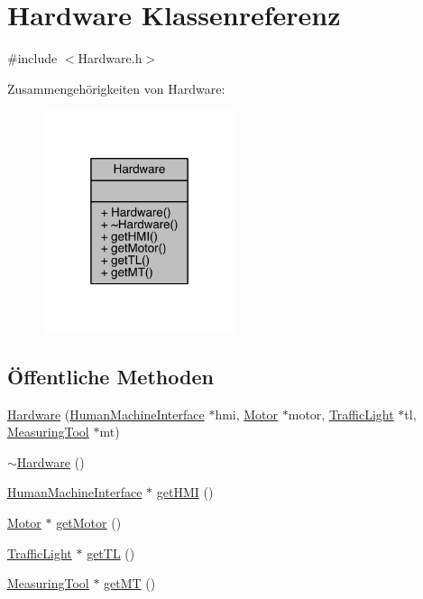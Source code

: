 \hypertarget{class_hardware}{}\section{Hardware Klassenreferenz}
\label{class_hardware}


{\ttfamily \#include $<$Hardware.\+h$>$}



Zusammengehörigkeiten von Hardware\+:\nopagebreak
\begin{figure}[H]
\begin{center}
\leavevmode
\includegraphics[width=160pt]{class_hardware__coll__graph}
\end{center}
\end{figure}
\subsection*{Öffentliche Methoden}
\begin{DoxyCompactItemize}
\item 
\hyperlink{class_hardware_a554fd479b788d6d73473aceb117f17d8}{Hardware} (\hyperlink{class_human_machine_interface}{Human\+Machine\+Interface} $\ast$hmi, \hyperlink{class_motor}{Motor} $\ast$motor, \hyperlink{class_traffic_light}{Traffic\+Light} $\ast$tl, \hyperlink{class_measuring_tool}{Measuring\+Tool} $\ast$mt)
\item 
\hyperlink{class_hardware_a92901a44130552d28485409bcf6906f5}{$\sim$\+Hardware} ()
\item 
\hyperlink{class_human_machine_interface}{Human\+Machine\+Interface} $\ast$ \hyperlink{class_hardware_aec8f013270ef5d6e79afed214b5c18cf}{get\+H\+MI} ()
\item 
\hyperlink{class_motor}{Motor} $\ast$ \hyperlink{class_hardware_a0a896143b14292ea1805d43e384b4fa1}{get\+Motor} ()
\item 
\hyperlink{class_traffic_light}{Traffic\+Light} $\ast$ \hyperlink{class_hardware_a558325fc00a829ca20112234a961b153}{get\+TL} ()
\item 
\hyperlink{class_measuring_tool}{Measuring\+Tool} $\ast$ \hyperlink{class_hardware_a6acc1b03b3c39ddbd681058f49e9f1bd}{get\+MT} ()
\end{DoxyCompactItemize}


